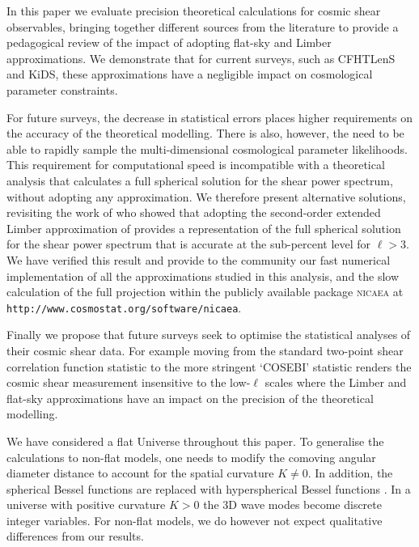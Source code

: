 In this paper we evaluate precision theoretical calculations for cosmic shear
observables, bringing together different sources from the literature to provide
a pedagogical review of the impact of adopting flat-sky and Limber
approximations.  We demonstrate that for current surveys, such as CFHTLenS
and KiDS, these approximations have a negligible impact on cosmological
parameter constraints.

For future surveys, the decrease in statistical errors places higher
requirements on the accuracy of the theoretical modelling.    There is also,
however, the need to be able to rapidly sample the multi-dimensional
cosmological parameter likelihoods.  This requirement for computational speed
is incompatible with a theoretical analysis that calculates a full spherical
solution for the shear power spectrum, without adopting any approximation.  We
therefore present alternative solutions, revisiting the work of
\citet{2012PhRvD..86b3001B} who showed that adopting the second-order extended
Limber approximation of \citet{2008PhRvD..78l3506L} provides a representation
of the full spherical solution for the shear power spectrum that is accurate at
the sub-percent level for $\ell > 3$.    We have verified this result and
provide to the community our fast numerical implementation of all the
approximations studied in this analysis, and the slow calculation of the full
projection within the publicly available package \textsc{nicaea} at
\texttt{http://www.cosmostat.org/software/nicaea}.

Finally we propose that future surveys seek to optimise the statistical
analyses of their cosmic shear data.  For example moving from the standard
two-point shear correlation function statistic to the more stringent `COSEBI'
statistic \citep{COSEBIs} renders the cosmic shear measurement insensitive to
the low-$\ell$ scales where the Limber and flat-sky approximations have an
impact on the precision of the theoretical modelling.  

We have considered a flat Universe throughout this paper. To generalise
the calculations to non-flat models, one needs to modify the comoving angular
diameter distance to account for the spatial curvature $K \ne 0$. In addition,
the spherical Bessel functions are replaced with hyperspherical Bessel
functions \citep{1986ApJ...308..546A}. In a universe with positive curvature
$K>0$ the 3D wave modes become discrete integer variables. For non-flat models,
we do however not expect qualitative differences from our results.

